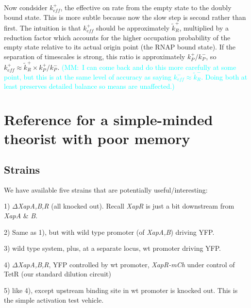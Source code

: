 \documentclass[12pt]{article}%
\newcommand{\rate}[3]{{#1}_{#2}^{#3}}
\newcommand{\mmnote}[1]{\textcolor{cyan}{(MM:~#1)}}
\begin{document}
Now condsider $\rate{k}{eff}{+}$,
the effective on rate from the empty state to the doubly bound state.
This is more subtle because now the slow step is second rather than first.
The intuition is that $\rate{k}{eff}{+}$ should be approximately
$\rate{\tilde{k}}{R}{+}$, multiplied by a reduction factor which accounts for
the higher occupation probability of the empty state relative to
its actual origin point (the RNAP bound state).
If the separation of timescales is strong,
this ratio is approximately $\rate{k}{P}{+}/\rate{k}{P}{-}$,
so $\rate{k}{eff}{+} \approx
    \rate{\tilde{k}}{R}{+}\times\rate{k}{P}{+}/\rate{k}{P}{-}$.
\mmnote{I can come back and do this more carefully at some point,
but this is at the same level of accuracy as saying
$\rate{k}{eff}{-} \approx \rate{\tilde{k}}{R}{-}$.
Doing both at least preserves detailed balance so means are unaffected.}



\appendix

\section{Reference for a simple-minded theorist with poor memory}

\subsection{Strains}
We have available five strains that are potentially useful/interesting:

1) $\Delta$\textit{XapA,B,R} (all knocked out).
Recall \textit{XapR} is just a bit downstream from \textit{XapA} \& \textit{B}.

2) Same as 1), but with wild type promoter (of \textit{XapA,B}) driving YFP.

3) wild type system, plus, at a separate locus, wt promoter driving YFP.

4) $\Delta$\textit{XapA,B,R}, YFP controlled by wt promoter,
\textit{XapR-mCh} under control of TetR (our standard dilution circuit)

5) like 4), except upstream binding site in wt promoter is knocked out.
This is the simple activation test vehicle.

\appendix



% 

\end{document}
